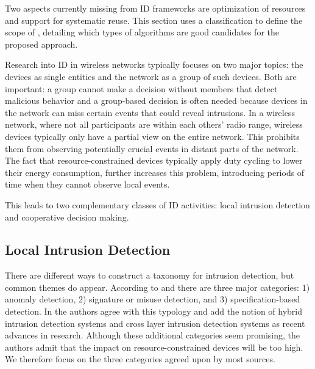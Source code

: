 \documentclass[conference]{IEEEtran}
\begin{document}
Two aspects currently missing from ID frameworks are optimization of resources
and support for systematic reuse. This section uses a classification to define
the scope of \NAME, detailing which types of algorithms are good candidates for
the proposed approach.

Research into ID in wireless networks typically focuses on two major topics:
the devices as single entities and the network as a group of such devices. Both
are important: a group cannot make a decision without members that detect
malicious behavior and a group-based decision is often needed because devices
in the network can miss certain events that could reveal intrusions. In a
wireless network, where not all participants are within each others' radio
range, wireless devices typically only have a partial view on the entire
network. This prohibits them from observing potentially crucial events in
distant parts of the network. The fact that resource-constrained devices
typically apply duty cycling to lower their energy consumption, further
increases this problem, introducing periods of time when they cannot observe
local events.

This leads to two complementary classes of ID activities: local intrusion
detection and cooperative decision making.

\subsection{Local Intrusion Detection}
\label{detection}

There are different ways to construct a taxonomy for intrusion detection, but
common themes do appear. According to \cite{mishra2004intrusion} and
\cite{ioannis2007towards} there are three major categories: 1) anomaly
detection, 2) signature or misuse detection, and 3) specification-based
detection. In \cite{alrajeh2013intrusion} the authors agree with this typology
and add the notion of hybrid intrusion detection systems and cross layer
intrusion detection systems as recent advances in research. Although these
additional categories seem promising, the authors admit that the impact on
resource-constrained devices will be too high. We therefore focus on the three
categories agreed upon by most sources.
\end{document}
